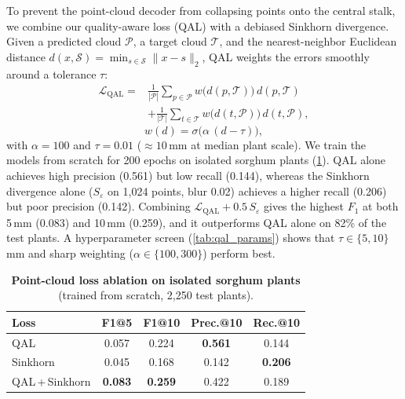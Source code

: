 \documentclass[10pt,twocolumn,letterpaper]{article}
\begin{document}
To prevent the point-cloud decoder from collapsing points onto the central stalk, we combine our quality-aware loss (QAL) with a debiased Sinkhorn divergence. Given a predicted cloud $\mathcal{P}$, a target cloud $\mathcal{T}$, and the nearest-neighbor Euclidean distance $d(x,\mathcal{S}) = \min_{s\in\mathcal{S}} \|x-s\|_2$, QAL weights the errors smoothly around a tolerance $\tau$:
\begin{equation}
  \begin{aligned}
    \mathcal{L}_{\mathrm{QAL}} ={}& \frac{1}{|\mathcal{P}|}\sum_{p\in\mathcal{P}} w\big(d(p,\mathcal{T})\big)\,d(p,\mathcal{T})\\
      &+ \frac{1}{|\mathcal{T}|}\sum_{t\in\mathcal{T}} w\big(d(t,\mathcal{P})\big)\,d(t,\mathcal{P}),
  \end{aligned}
  \label{eq:qal}
\end{equation}
\begin{equation}
  w(d) = \sigma\big(\alpha\,(d-\tau)\big),
  \label{eq:qal_w}
\end{equation}
with $\alpha = 100$ and $\tau = 0.01$ ($\approx 10$\,mm at median plant scale). We train the models from scratch for 200 epochs on isolated sorghum plants (\cref{tab:loss_single}). QAL alone achieves high precision (0.561) but low recall (0.144), whereas the Sinkhorn divergence alone ($S_\varepsilon$ on 1{,}024 points, blur 0.02) achieves a higher recall (0.206) but poor precision (0.142). Combining $\mathcal{L}_{\mathrm{QAL}} + 0.5\,S_\varepsilon$ gives the highest $F_1$ at both 5\,mm (0.083) and 10\,mm (0.259), and it outperforms QAL alone on 82\% of the test plants. A hyperparameter screen (\cref{tab:qal_params}) shows that $\tau \in \{5, 10\}$\,mm and sharp weighting ($\alpha \in \{100, 300\}$) perform best.

\begin{table}[t]
  \caption{\textbf{Point-cloud loss ablation on isolated sorghum plants} (trained from scratch, 2{,}250 test plants).}
  \label{tab:loss_single}
  \centering\small
  \setlength{\tabcolsep}{3pt}
  \begin{tabular}{@{}lcccc@{}}
    \toprule
    Loss & F1@5 & F1@10 & Prec.@10 & Rec.@10 \\
    \midrule
    QAL              & 0.057          & 0.224          & \textbf{0.561} & 0.144 \\
    Sinkhorn         & 0.045          & 0.168          & 0.142          & \textbf{0.206} \\
    QAL\,+\,Sinkhorn & \textbf{0.083} & \textbf{0.259} & 0.422          & 0.189 \\
    \bottomrule
  \end{tabular}
\end{table}
\end{document}

